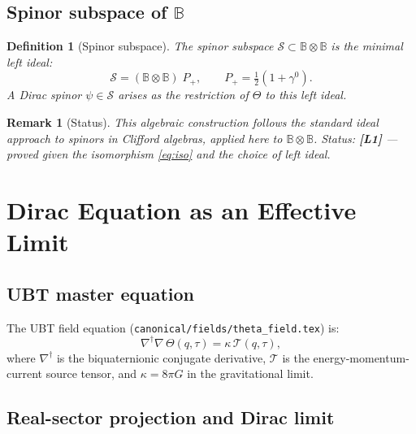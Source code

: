 \documentclass[11pt,a4paper]{article}
\newtheorem{definition}{Definition}
\newtheorem{remark}{Remark}
\begin{document}
\subsection{Spinor subspace of \texorpdfstring{$\mathbb{B}$}{B}}

\begin{definition}[Spinor subspace]
  The spinor subspace $\mathcal{S} \subset \mathbb{B}\otimes\mathbb{B}$ is
  the minimal left ideal:
  \begin{equation}
    \mathcal{S} = (\mathbb{B}\otimes\mathbb{B})\; P_+,
    \qquad P_+ = \tfrac{1}{2}(1 + \gamma^0).
  \end{equation}
  A Dirac spinor $\psi \in \mathcal{S}$ arises as the restriction of
  $\Theta$ to this left ideal.
\end{definition}

\begin{remark}[Status]
  This algebraic construction follows the standard ideal approach to
  spinors in Clifford algebras, applied here to $\mathbb{B}\otimes\mathbb{B}$.
  Status: \textbf{[L1]} — proved given the isomorphism \eqref{eq:iso}
  and the choice of left ideal.
\end{remark}

\section{Dirac Equation as an Effective Limit}
\label{sec:dirac}

\subsection{UBT master equation}

The UBT field equation (\texttt{canonical/fields/theta\_field.tex}) is:
\begin{equation}
\label{eq:master}
  \nabla^\dagger\nabla\,\Theta(q,\tau) = \kappa\,\mathcal{T}(q,\tau),
\end{equation}
where $\nabla^\dagger$ is the biquaternionic conjugate derivative,
$\mathcal{T}$ is the energy-momentum-current source tensor, and
$\kappa = 8\pi G$ in the gravitational limit.

\subsection{Real-sector projection and Dirac limit}
\end{document}
